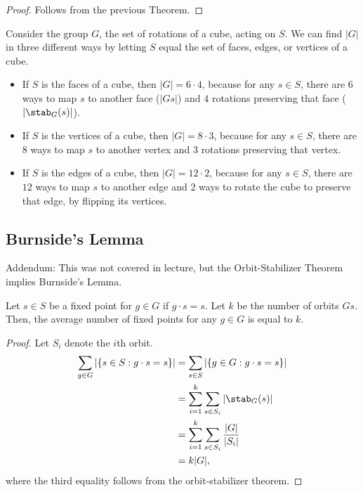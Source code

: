 \begin{proof}
Follows from the previous Theorem.
\end{proof}

\begin{example}
\exlabel

Consider the group $G$, the set of rotations of a cube, acting on $S$. We can find $\vert G\vert$ in three different ways by letting $S$ equal the set of faces, edges, or vertices of a cube.

\begin{itemize}
    \item If $S$ is the faces of a cube, then $\vert G\vert = 6\cdot 4$, because for any $s\in S$, there are $6$ ways to map $s$ to another face ($\vert Gs\vert$) and $4$ rotations preserving that face ($\vert \stab_G(s)\vert$).
    \item If $S$ is the vertices of a cube, then $\vert G\vert = 8\cdot 3$, because for any $s\in S$, there are $8$ ways to map $s$ to another vertex and $3$ rotations preserving that vertex.
    \item If $S$ is the edges of a cube, then $\vert G\vert = 12\cdot 2$, because for any $s\in S$, there are $12$ ways to map $s$ to another edge and $2$ ways to rotate the cube to preserve that edge, by flipping its vertices.
\end{itemize}
\end{example}

\subsection{Burnside's Lemma}

Addendum: This was not covered in lecture, but the Orbit-Stabilizer Theorem implies Burnside's Lemma. 

\begin{theorem}

Let $s\in S$ be a fixed point for $g\in G$ if $g\cdot s = s$. Let $k$ be the number of orbits $Gs$. Then, the average number of fixed points for any $g\in G$ is equal to $k$.
\end{theorem}


\begin{proof}
Let $S_i$ denote the $i$th orbit.
\begin{align*}
    \sum_{g\in G}\vert \{s\in S : g\cdot s = s\}\vert &= \sum_{s\in S}\vert \{g\in G: g\cdot s = s\}\vert\\
    &= \sum_{i=1}^k \sum_{s\in S_i}\vert\stab_G(s)\vert \\
    &= \sum_{i=1}^k \sum_{s\in S_i}\frac{\vert G\vert}{\vert S_i\vert} \\
    &= k\vert G\vert,
\end{align*}
where the third equality follows from the orbit-stabilizer theorem.
\end{proof}

